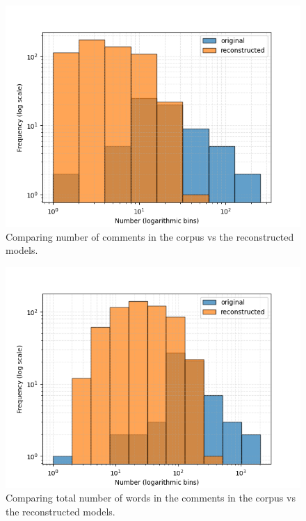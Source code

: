 \begin{figure}[htbp]
\centerline{\includegraphics[width=\linewidth]{"./Comparing number of comments in the corpus vs the reconstructed models.png"}}
\caption{Comparing number of comments in the corpus vs the reconstructed models.}
\label{fig}
\end{figure}


\begin{figure}[htbp]
\centerline{\includegraphics[width=\linewidth]{"./Comparing total number of words in the comments in the corpus vs the reconstructed models.png"}}
\caption{Comparing total number of words in the comments in the corpus vs the reconstructed models.}
\label{fig}
\end{figure}


